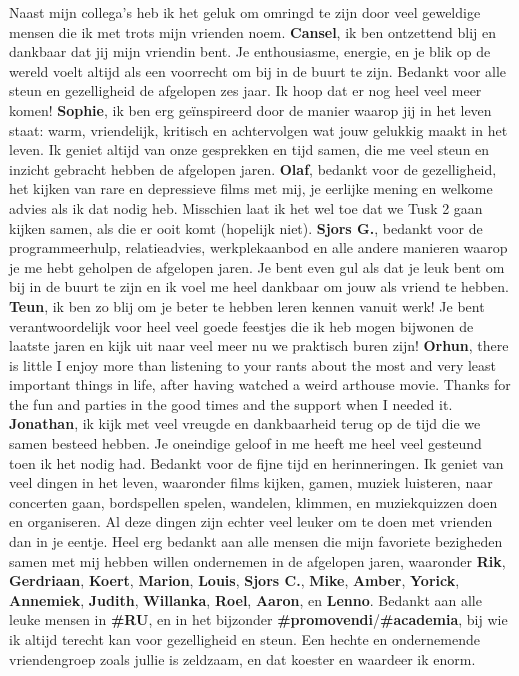 Naast mijn collega's heb ik het geluk om omringd te zijn door veel geweldige mensen die ik met trots mijn vrienden noem. \newline
\textbf{Cansel}, ik ben ontzettend blij en dankbaar dat jij mijn vriendin bent. Je enthousiasme, energie, en je blik op de wereld voelt altijd als een voorrecht om bij in de buurt te zijn. Bedankt voor alle steun en gezelligheid de afgelopen zes jaar. Ik hoop dat er nog heel veel meer komen! \newline 
\textbf{Sophie}, ik ben erg ge\"{i}nspireerd door de manier waarop jij in het leven staat: warm, vriendelijk, kritisch en achtervolgen wat jouw gelukkig maakt in het leven. Ik geniet altijd van onze gesprekken en tijd samen, die me veel steun en inzicht gebracht hebben de afgelopen jaren. \newline 
\textbf{Olaf}, bedankt voor de gezelligheid, het kijken van rare en depressieve films met mij, je eerlijke mening en welkome advies als ik dat nodig heb. Misschien laat ik het wel toe dat we Tusk 2 gaan kijken samen, als die er ooit komt (hopelijk niet). \newline
\textbf{Sjors G.}, bedankt voor de programmeerhulp, relatieadvies, werkplekaanbod en alle andere manieren waarop je me hebt geholpen de afgelopen jaren. Je bent even gul als dat je leuk bent om bij in de buurt te zijn en ik voel me heel dankbaar om jouw als vriend te hebben. \newline 
\textbf{Teun}, ik ben zo blij om je beter te hebben leren kennen vanuit werk! Je bent verantwoordelijk voor heel veel goede feestjes die ik heb mogen bijwonen de laatste jaren en kijk uit naar veel meer nu we praktisch buren zijn! \newline
\textbf{Orhun}, there is little I enjoy more than listening to your rants about the most and very least important things in life, after having watched a weird arthouse movie. Thanks for the fun and parties in the good times and the support when I needed it. \newline 
\textbf{Jonathan}, ik kijk met veel vreugde en dankbaarheid terug op de tijd die we samen besteed hebben. Je oneindige geloof in me heeft me heel veel gesteund toen ik het nodig had. Bedankt voor de fijne tijd en herinneringen. \newline 
Ik geniet van veel dingen in het leven, waaronder films kijken, gamen, muziek luisteren, naar concerten gaan, bordspellen spelen, wandelen, klimmen, en muziekquizzen doen en organiseren. Al deze dingen zijn echter veel leuker om te doen met vrienden dan in je eentje. Heel erg bedankt aan alle mensen die mijn favoriete bezigheden samen met mij hebben willen ondernemen in de afgelopen jaren, waaronder \textbf{Rik}, \textbf{Gerdriaan}, \textbf{Koert}, \textbf{Marion}, \textbf{Louis}, \textbf{Sjors C.}, \textbf{Mike}, \textbf{Amber}, \textbf{Yorick}, \textbf{Annemiek}, \textbf{Judith}, \textbf{Willanka}, \textbf{Roel}, \textbf{Aaron}, en \textbf{Lenno}. \newline
Bedankt aan alle leuke mensen in \textbf{\#RU}, en in het bijzonder \textbf{\#promovendi}/\textbf{\#academia}, bij wie ik altijd terecht kan voor gezelligheid en steun. Een hechte en ondernemende vriendengroep zoals jullie is zeldzaam, en dat koester en waardeer ik enorm.

